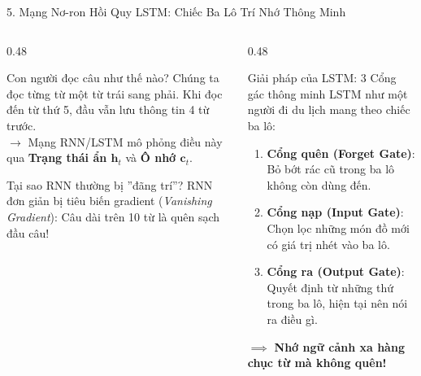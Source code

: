 \documentclass[aspectratio=169, 10pt]{beamer}
\begin{document}
\begin{frame}{5. Mạng Nơ-ron Hồi Quy LSTM: Chiếc Ba Lô Trí Nhớ Thông Minh}
  \begin{columns}[T, onlytextwidth]
    \begin{column}{0.48\textwidth}
      \begin{block}{Con người đọc câu như thế nào?}
        \fontsize{7.5}{9.5}\selectfont
        Chúng ta đọc từng từ một từ trái sang phải. Khi đọc đến từ thứ 5, đầu vẫn lưu thông tin 4 từ trước.\\
        $\to$ Mạng RNN/LSTM mô phỏng điều này qua \textbf{Trạng thái ẩn $\mathbf{h}_t$} và \textbf{Ô nhớ $\mathbf{c}_t$}.
      \end{block}
      \vspace{0.15cm}
      \begin{alertblock}{Tại sao RNN thường bị ''đãng trí''?}
        \fontsize{7.5}{9.5}\selectfont
        RNN đơn giản bị tiêu biến gradient (\textit{Vanishing Gradient}): Câu dài trên 10 từ là quên sạch đầu câu!
      \end{alertblock}
    \end{column}
    \hfill
    \begin{column}{0.48\textwidth}
      \begin{exampleblock}{Giải pháp của LSTM: 3 Cổng gác thông minh}
        \fontsize{7.5}{9.5}\selectfont
        LSTM như một người đi du lịch mang theo chiếc ba lô:
        \begin{enumerate}\setlength{\itemsep}{0.2em}
          \item \textbf{Cổng quên (Forget Gate)}: Bỏ bớt rác cũ trong ba lô không còn dùng đến.
          \item \textbf{Cổng nạp (Input Gate)}: Chọn lọc những món đồ mới có giá trị nhét vào ba lô.
          \item \textbf{Cổng ra (Output Gate)}: Quyết định từ những thứ trong ba lô, hiện tại nên nói ra điều gì.
        \end{enumerate}
        $\implies$ \textbf{Nhớ ngữ cảnh xa hàng chục từ mà không quên!}
      \end{exampleblock}
    \end{column}
  \end{columns}
\end{frame}
\end{document}
